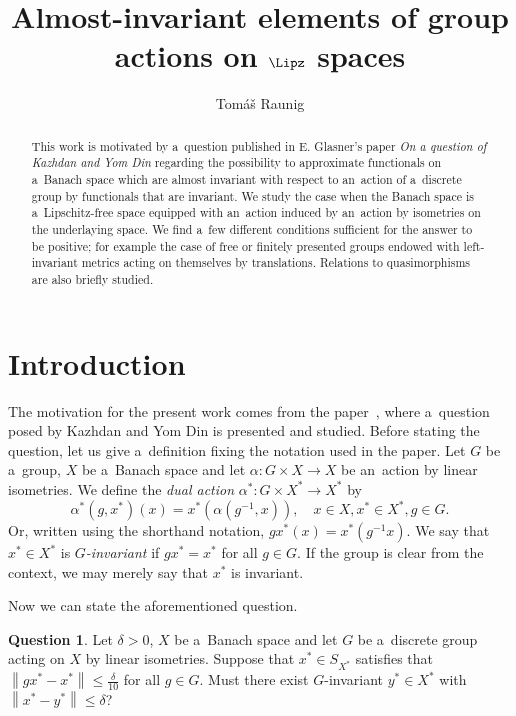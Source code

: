 \documentclass[11pt,a4paper]{amsart}
\title{Almost-invariant elements of group actions on $\Lipz$ spaces}
\author{Tom\'a\v s Raunig}
\date{}
\theoremstyle{definition}
\newtheorem{question}[theorem]{Question}
\newcommand{\norm}[1]{\left\| #1 \right\|}
\begin{document}
	
	\begin{abstract}
		This work is motivated by a~question published in E. Glasner's paper \emph{On a question of Kazhdan and Yom Din} regarding the possibility to approximate functionals on a~Banach space which are almost invariant with respect to an~action of a~discrete group by functionals that are invariant. We study the case when the Banach space is a~Lipschitz-free space equipped with an~action induced by an~action by isometries on the underlaying space. We find a~few different conditions sufficient for the answer to be positive; for example the case of free or finitely presented groups endowed with left-invariant metrics acting on themselves by translations. Relations to quasimorphisms are also briefly studied.
	\end{abstract}
	
	\maketitle
	
	\section{Introduction}
	
	The motivation for the present work comes from the paper~\cite{Glasner22}, where a~question posed by Kazhdan and Yom Din is presented and studied. Before stating the question, let us give a~definition fixing the notation used in the paper. Let $G$ be a~group, $X$ be a~Banach space and let $\alpha: G \times X \to X$ be an~action by linear isometries. We define the \emph{dual action} $\alpha^*: G \times X^* \to X^*$ by
	\begin{equation*}
		\alpha^*(g, x^*)(x) = x^*(\alpha(g^{-1}, x)), \quad x\in X, x^* \in X^*, g \in G.
	\end{equation*}
	Or, written using the shorthand notation, $gx^*(x) = x^*(g^{-1}x)$.
	We say that $x^* \in X^*$ is \emph{$G$-invariant} if $gx^* = x^*$ for all $g \in G$. If the group is clear from the context, we may merely say that $x^*$ is invariant.
	
	Now we can state the aforementioned question.
	\begin{question} \label{que:KYD}
		Let $\delta > 0$, $X$ be a~Banach space and let $G$ be a~discrete group acting on $X$ by linear isometries. Suppose that $x^* \in S_{X^*}$ satisfies that $\norm{gx^* - x^*} \leq \frac{\delta}{10}$ for all $g \in G$. Must there exist $G$-invariant $y^* \in X^*$ with $\norm{x^* - y^*} \leq \delta$?
	\end{question}
	
\end{document}
